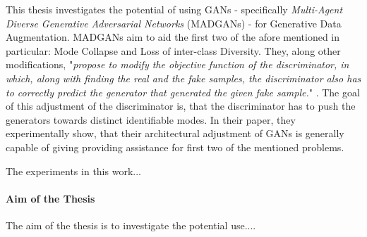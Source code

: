 This thesis investigates the potential of using GANs - specifically \textit{Multi-Agent Diverse Generative Adversarial Networks} (MADGANs) \cite{ghosh2018multiagentdiversegenerativeadversarial} - for Generative Data Augmentation. MADGANs aim to aid the first two of the afore mentioned in particular: Mode Collapse and Loss of inter-class Diversity. They, along other modifications, "\textit{propose to modify the objective function of the discriminator, in which, along with finding the real and the fake samples, the discriminator also has to correctly predict the generator that generated the given fake sample.}" \cite{ghosh2018multiagentdiversegenerativeadversarial}. The goal of this adjustment of the discriminator is, that the discriminator has to push the generators towards distinct identifiable modes. In their paper, they experimentally show, that their architectural adjustment of GANs is generally capable of giving providing assistance for first two of the mentioned problems.

The experiments in this work...

\paragraph{Aim of the Thesis}\label{aim_of_the_thesis}
The aim of the thesis is to investigate the potential use....


\newpage
